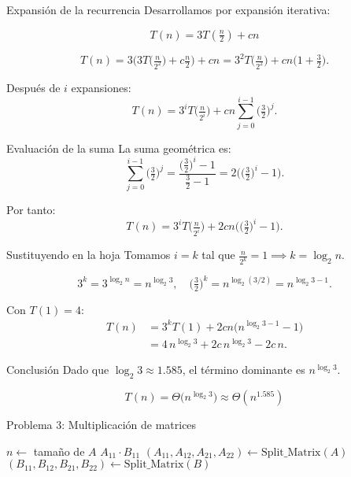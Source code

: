 \documentclass{beamer}
\begin{document}
\begin{frame}{Expansión de la recurrencia}
Desarrollamos por expansión iterativa:

\[
T(n) = 3T\!\left(\tfrac{n}{2}\right)+c n
\]

\[
T(n) = 3\Big(3T\!\big(\tfrac{n}{2^2}\big)+c\tfrac{n}{2}\Big)+c n
= 3^2 T\!\big(\tfrac{n}{2^2}\big) + c n\Big(1+\tfrac{3}{2}\Big).
\]

Después de $i$ expansiones:
\[
T(n)=3^{i}T\!\big(\tfrac{n}{2^{i}}\big) + c n\sum_{j=0}^{i-1}\Big(\tfrac{3}{2}\Big)^{j}.
\]
\end{frame}

\begin{frame}{Evaluación de la suma}
La suma geométrica es:
\[
\sum_{j=0}^{i-1}\Big(\tfrac{3}{2}\Big)^{j}
= \frac{\big(\tfrac{3}{2}\big)^{i}-1}{\tfrac{3}{2}-1}
= 2\Big(\big(\tfrac{3}{2}\big)^{i}-1\Big).
\]

Por tanto:
\[
T(n)=3^{i}T\!\big(\tfrac{n}{2^{i}}\big) + 2c n\Big(\big(\tfrac{3}{2}\big)^{i}-1\Big).
\]
\end{frame}

\begin{frame}{Sustituyendo en la hoja}
Tomamos $i=k$ tal que $\tfrac{n}{2^{k}}=1 \implies k=\log_2 n$.

\[
3^{k}=3^{\log_2 n}=n^{\log_2 3}, \quad
\Big(\tfrac{3}{2}\Big)^{k}=n^{\log_2(3/2)}=n^{\log_2 3 -1}.
\]

Con $T(1)=4$:
\[
\begin{aligned}
T(n) &= 3^{k}T(1) + 2c n\Big(n^{\log_2 3 -1}-1\Big)\\[6pt]
     &= 4\,n^{\log_2 3} + 2c\,n^{\log_2 3} - 2c\,n.
\end{aligned}
\]
\end{frame}

\begin{frame}{Conclusión}
Dado que $\log_2 3 \approx 1.585$, el término dominante es $n^{\log_2 3}$.

\[
\boxed{T(n)=\Theta\!\big(n^{\log_2 3}\big) \approx \Theta(n^{1.585})}
\]


\end{frame}



\begin{frame}{Problema 3: Multiplicación de matrices}
\scriptsize %
\begin{algorithm}[H]
\caption{Multiplicación de matrices por divide y vencerás(Parte I)}
\begin{algorithmic}[1]
    \State $n \gets$ tamaño de $A$
      \State \Return $A_{11} \cdot B_{11}$
    \EndIf
    \State $(A_{11}, A_{12}, A_{21}, A_{22}) \gets \text{Split\_Matrix}(A)$
    \State $(B_{11}, B_{12}, B_{21}, B_{22}) \gets \text{Split\_Matrix}(B)
    $
  \EndFunction
\end{algorithmic}
\end{algorithm}
\end{frame}
\end{document}
